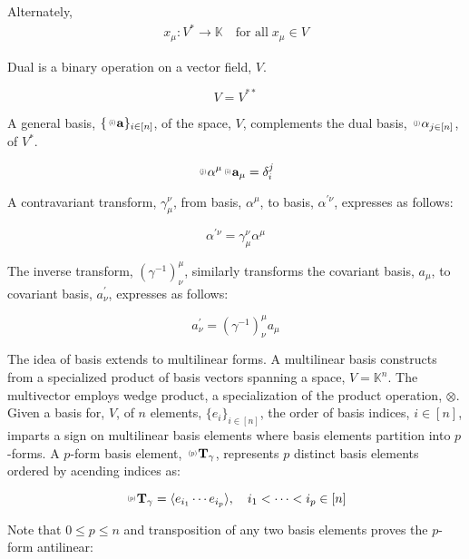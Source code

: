 \documentclass[aps,twocolumn,secnumarabic,nobalancelastpage,amsmath,amssymb,
amsthm,nofootinbib,parskip=full]{revtex4}
\numberwithin{equation}{section}
\newcommand{\ppv}[2]{{\,\raisebox{2pt}{\scalebox{.5}{(#1)\,}}}#2}
\newcommand{\sv}[1]{\mathbf{#1}}
\newcommand{\svl}[2]{\ppv{#1}{\sv{#2}}}
\newcommand{\pa}[1]{\left(#1\right)}
\begin{document}
Alternately,
\begin{equation*}
\begin{array}{rcl}
x_\mu:V^*\rightarrow\mathbb{K}\quad\text{for all}\;x_\mu\in V
\end{array}
\end{equation*}

Dual is a binary operation on a vector field, $V$.

\begin{equation*}
V=V^{**}
\end{equation*}

A general basis, $\{\svl{i}{a}\}_{i\in[n]}$, of the space, $V$,
complements the dual basis, $\svl{j}{\alpha}_{j\in[n]}$, of $V^*$.

\begin{equation*}
\svl{j}{\alpha}^\mu \svl{i}{a}_\mu=\delta^j_i
\end{equation*}

A contravariant transform, $\gamma^\nu_\mu$, from basis,
$\alpha^\mu$, to basis, $\alpha^{\prime\nu}$, expresses as follows:

\begin{equation*}
\alpha^{\prime\nu}=\gamma^\nu_\mu\alpha^\mu
\end{equation*}

The inverse transform, $\pa{\gamma^{-1}}_\nu^\mu$, similarly transforms
the covariant basis, $a_\mu$, to covariant basis,
$a^\prime_\nu$, expresses as follows:

\begin{equation*}
a^\prime_\nu=\pa{\gamma^{-1}}_\nu^\mu a_\mu
\end{equation*}

The idea of basis extends to multilinear forms.
A multilinear basis constructs from a specialized product
of basis vectors spanning a space, $V=\mathbb{K}^n$.
The multivector employs wedge product, a specialization of
the product operation, $\otimes$.
Given a basis for, $V$, of $n$ elements, $\{e_i\}_{i\in[n]}$,
the order of basis indices, ${i\in[n]}$, imparts a sign
on multilinear basis elements where basis elements
partition into $p$-forms.
A $p$-form basis element, $\svl{p}{T}_\gamma$,
represents $p$ distinct basis elements
ordered by acending indices as:

\begin{equation*}
\svl{p}{T}_\gamma=
\langle e_{i_1}\cdots e_{i_p}\rangle,\quad i_1<\cdots<i_p\in[n]
\end{equation*}

Note that $0\leq p\leq n$ and transposition of any two basis
elements proves the $p$-form antilinear:
\end{document}
